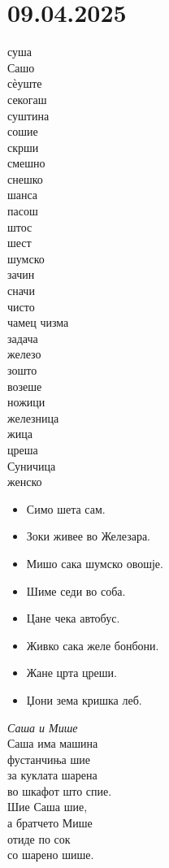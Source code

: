 \documentclass[a5paper,12pt]{article}
\newenvironment{activity}[1]{%
  \begin{tcolorbox}[colback=boxcolor,colframe=titlecolor,title={\textbf{#1}},fonttitle=\bfseries]
}{%
  \end{tcolorbox}
}
\newenvironment{song}{%
  \begin{tcolorbox}[colback=warmredbg,colframe=warmred,title={\textbf{Песничка}},fonttitle=\bfseries]
}{%
  \end{tcolorbox}
}
\begin{document}
\section{09.04.2025}
\begin{activity}{Зборчиња}
\begin{multicols}{4}
суша\\ Сашо\\ сѐуште\\ секогаш\\ суштина\\ сошие\\ скрши\\ смешно\\ снешко\\ шанса\\ пасош\\ штос\\ шест\\ шумско\\ зачин\\ сначи\\ чисто\\ чамец
чизма\\ задача\\ железо\\ зошто\\ возеше\\ ножици\\ железница\\ жица\\ цреша\\ Суничица\\ женско
\end{multicols}
\end{activity}

\begin{itemize}
    \item Симо шета сам. 
    \item Зоки живее во Железара. 
    \item Мишо сака шумско овошје. 
    \item Шиме седи во соба. 
    \item Цане чека автобус. 
    \item Живко сака желе бонбони. 
    \item Жане црта цреши. 
    \item Џони зема кришка леб.
\end{itemize}

\begin{song}
  \textsl{Саша и Мише}\\

  Саша има машина\\
  фустанчиња шие\\
  за куклата шарена\\
  во шкафот што спие.\\


  Шие Саша шие,\\
  а братчето Мише \\
  отиде по сок \\
  со шарено шише.
\end{song}
\end{document}
